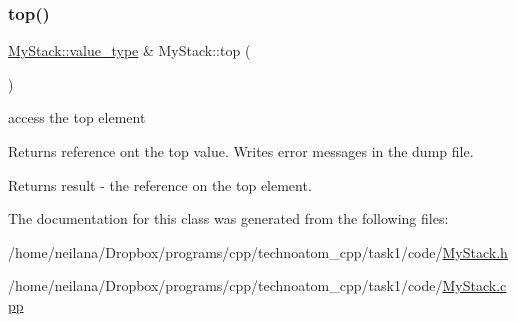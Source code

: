 \subsubsection{\texorpdfstring{top()}{top()}}
{\footnotesize\ttfamily \hyperlink{class_my_stack_aef491ce2544b335e96d24a39ad23bc7c}{My\+Stack\+::value\+\_\+type} \& My\+Stack\+::top (\begin{DoxyParamCaption}{ }\end{DoxyParamCaption})}



access the top element 

Returns reference ont the top value. Writes error messages in the dump file.

\begin{DoxyReturn}{Returns}
{\ttfamily result} -\/ the reference on the top element. 
\end{DoxyReturn}


The documentation for this class was generated from the following files\+:\begin{DoxyCompactItemize}
\item 
/home/neilana/\+Dropbox/programs/cpp/technoatom\+\_\+cpp/task1/code/\hyperlink{_my_stack_8h}{My\+Stack.\+h}\item 
/home/neilana/\+Dropbox/programs/cpp/technoatom\+\_\+cpp/task1/code/\hyperlink{_my_stack_8cpp}{My\+Stack.\+cpp}\end{DoxyCompactItemize}
